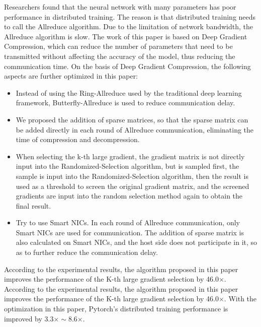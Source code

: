 \begin{eabstract}
  Researchers found that the neural network with many parameters has poor performance in distributed training. The reason is that distributed training needs to call the Allreduce algorithm. Due to the limitation of network bandwidth, the Allreduce algorithm is slow. The work of this paper is based on Deep Gradient Compression, which can reduce the number of parameters that need to be transmitted without affecting the accuracy of the model, thus reducing the communication time. On the basis of Deep Gradient Compression, the following aspects are further optimized in this paper:
  \begin{itemize}
    \item Instead of using the Ring-Allreduce used by the traditional deep learning framework, Butterfly-Allreduce is used to reduce communication delay.
    \item We proposed the addition of sparse matrices, so that the sparse matrix can be added directly in each round of Allreduce communication, eliminating the time of compression and decompression.
    \item When selecting the k-th large gradient, the gradient matrix is not directly input into the Randomized-Selection algorithm, but is sampled first, the sample is input into the Randomized-Selection algorithm, then the result is used as a threshold to screen the original gradient matrix, and the screened gradients are input into the random selection method again to obtain the final result.
    \item Try to use Smart NICs. In each round of Allreduce communication, only Smart NICs are used for communication. The addition of sparse matrix is also calculated on Smart NICs, and the host side does not participate in it, so as to further reduce the communication delay.
\end{itemize}

According to the experimental results, the algorithm proposed in this paper improves the performance of the K-th large gradient selection by 46.0$\times$. According to the experimental results, the algorithm proposed in this paper improves the performance of the K-th large gradient selection by 46.0$\times$. With the optimization in this paper, Pytorch's distributed training performance is improved by 3.3$\times \sim$8.6$\times$.

\end{eabstract}

